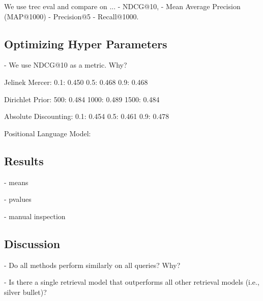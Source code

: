 

We use trec eval and compare on ...
- NDCG@10, 
- Mean Average Precision (MAP@1000) 
- Precision@5
- Recall@1000.

\subsection{Optimizing Hyper Parameters}

- We use NDCG@10 as a metric. Why?

Jelinek Mercer:
0.1: 0.450
0.5: 0.468
0.9: 0.468

Dirichlet Prior:
500: 0.484
1000: 0.489
1500: 0.484

Absolute Discounting:
0.1: 0.454
0.5: 0.461
0.9: 0.478

Positional Language Model:




\subsection{Results}

- means



- pvalues

- manual inspection

\subsection{Discussion}

- Do all methods perform similarly on all queries? Why?

- Is there a single retrieval model that outperforms all other retrieval models (i.e., silver bullet)?